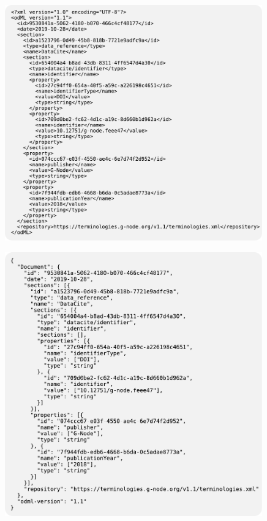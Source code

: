 \documentclass{article}
\begin{document}
\begin{figure}
   \begin{minipage}[b]{.3\linewidth}
     \centering
     \includegraphics[width=0.99\textwidth]{figures/figFormatExampleA.pdf}
     \label{fig:odmlFormatExampleXML}
   \end{minipage}
   \begin{minipage}[b]{.3\linewidth}
     \centering
     \includegraphics[width=0.99\textwidth]{figures/figFormatExampleB.pdf}

\end{minipage}
\end{figure}
\end{document}
